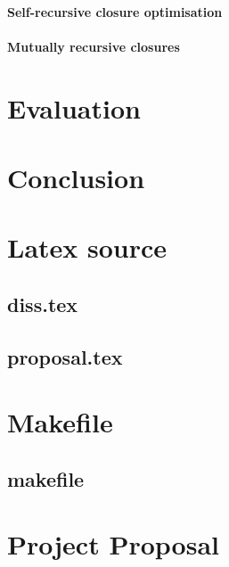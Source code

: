 \documentclass[12pt,a4paper,twoside,openright]{report}
\begin{document}
\subsubsection{Self-recursive closure optimisation}

\subsubsection{Mutually recursive closures}


\chapter{Evaluation}


\chapter{Conclusion}





\appendix

\chapter{Latex source}

\section{diss.tex}
{\scriptsize}

\section{proposal.tex}
{\scriptsize}

\chapter{Makefile}

\section{makefile}\label{makefile}



\chapter{Project Proposal}

%
\end{document}
